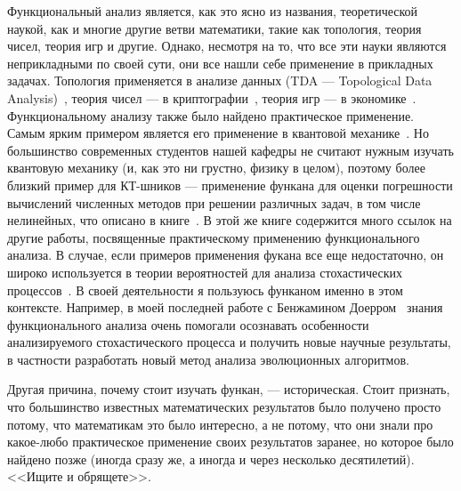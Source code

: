 \documentclass[russian]{article}
\begin{document}
Функциональный анализ является, как это ясно из названия, теоретической наукой, как и многие другие ветви математики, такие как топология, теория чисел, теория игр и другие. Однако, несмотря на то, что все эти науки являются неприкладными по своей сути, они все нашли себе применение в прикладных задачах. Топология применяется в анализе данных (TDA --- Topological Data Analysis)~\cite{topology}, теория чисел --- в криптографии~\cite{numbers}, теория игр --- в экономике~\cite{games}. Функциональному анализу также было найдено практическое применение. Самым ярким примером является его применение в квантовой механике~\cite{quantum}. Но большинство современных студентов нашей кафедры не считают нужным изучать квантовую механику (и, как это ни грустно, физику в целом), поэтому более близкий пример для КТ-шников --- применение функана для оценки погрешности вычислений численных методов при решении различных задач, в том числе нелинейных, что описано в книге~\cite{kollats}. В этой же книге содержится много ссылок на другие работы, посвященные практическому применению функционального анализа. В случае, если примеров применения фукана все еще недостаточно, он широко используется в теории вероятностей для анализа стохастических процессов~\cite{prob}. В своей деятельности я пользуюсь функаном именно в этом контексте. Например, в моей последней работе с Бенжамином Доерром~\cite{plateau} знания функционального анализа очень помогали осознавать особенности анализируемого стохастического процесса и получить новые научные результаты, в частности разработать новый метод анализа эволюционных алгоритмов.

Другая причина, почему стоит изучать функан, --- историческая. Стоит признать, что большинство известных математических результатов было получено просто потому, что математикам это было интересно, а не потому, что они знали про какое-любо практическое применение своих результатов заранее, но которое было найдено позже (иногда сразу же, а иногда и через несколько десятилетий). <<Ищите и обрящете>>.
\end{document}
